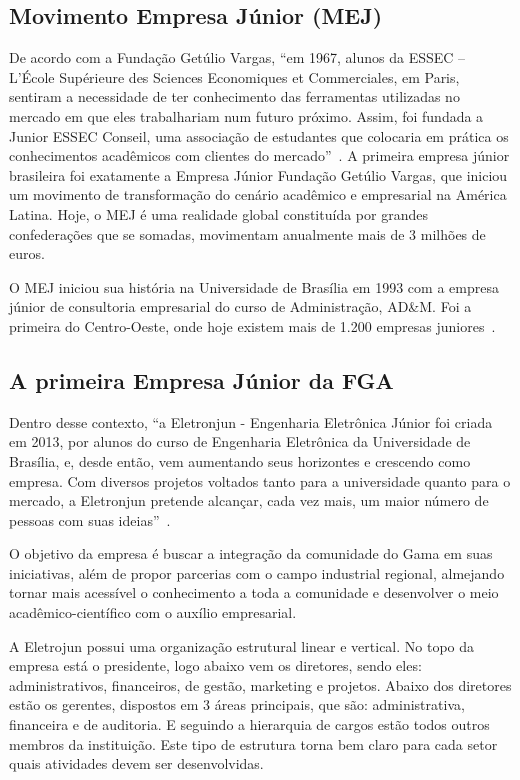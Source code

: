 \subsection{Movimento Empresa Júnior (MEJ)}
De acordo com a Fundação Getúlio Vargas, “em 1967, alunos da ESSEC – L’École Supérieure des Sciences Economiques et Commerciales, em Paris, sentiram a necessidade de ter conhecimento das ferramentas utilizadas no mercado em que eles trabalhariam num futuro próximo. Assim, foi fundada a Junior ESSEC Conseil, uma associação de estudantes que colocaria em prática os conhecimentos acadêmicos com clientes do mercado”~\cite{fgv}.
A primeira empresa júnior brasileira foi exatamente a Empresa Júnior Fundação Getúlio Vargas, que iniciou um movimento de transformação do cenário acadêmico e empresarial na América Latina. Hoje, o MEJ é uma realidade global constituída por grandes confederações que se somadas, movimentam anualmente mais de 3 milhões de euros.

O MEJ iniciou sua história na Universidade de Brasília em 1993 com a empresa júnior de consultoria empresarial do curso de Administração, AD\&M. Foi a primeira do Centro-Oeste, onde hoje existem mais de 1.200 empresas juniores~\cite{fgv}.

\subsection{A primeira Empresa Júnior da FGA}
Dentro desse contexto, “a Eletronjun - Engenharia Eletrônica Júnior foi criada em 2013, por alunos do curso de Engenharia Eletrônica da Universidade de Brasília, e, desde então, vem aumentando seus horizontes e crescendo como empresa. Com diversos projetos voltados tanto para a universidade quanto para o mercado, a Eletronjun pretende alcançar, cada vez mais, um maior número de pessoas com suas ideias”~\cite{eletronjun}.

O objetivo da empresa é buscar a integração da comunidade do Gama em suas iniciativas, além de propor parcerias com o campo industrial regional, almejando tornar mais acessível o conhecimento a toda a comunidade e desenvolver o meio acadêmico-científico com o auxílio empresarial.
    
A Eletrojun possui uma organização estrutural linear e vertical. No topo da empresa está o presidente, logo abaixo vem os diretores, sendo eles: administrativos, financeiros, de gestão, marketing e projetos. Abaixo dos diretores estão os gerentes, dispostos em 3 áreas principais, que são: administrativa, financeira e de auditoria. E seguindo a hierarquia de cargos estão todos outros membros da instituição. Este tipo de estrutura torna bem claro para cada setor quais atividades devem ser desenvolvidas.

